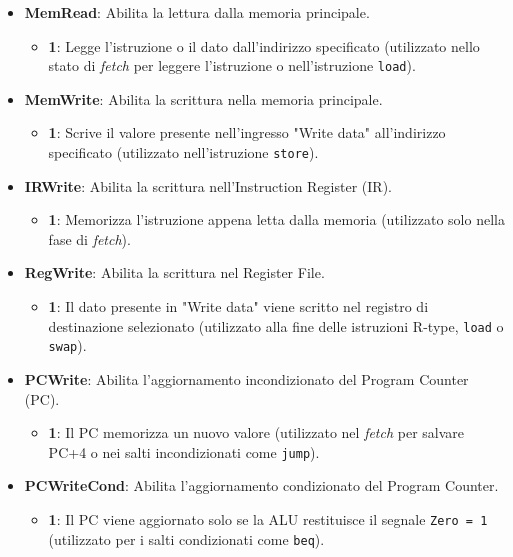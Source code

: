 \begin{itemize}
    \item \textbf{MemRead}: Abilita la lettura dalla memoria principale.
    \begin{itemize}
        \item \textbf{1}: Legge l'istruzione o il dato dall'indirizzo specificato (utilizzato nello stato di \textit{fetch} per leggere l'istruzione o nell'istruzione \texttt{load}).
    \end{itemize}
    \item \textbf{MemWrite}: Abilita la scrittura nella memoria principale.
    \begin{itemize}
        \item \textbf{1}: Scrive il valore presente nell'ingresso "Write data" all'indirizzo specificato (utilizzato nell'istruzione \texttt{store}).
    \end{itemize}
    \item \textbf{IRWrite}: Abilita la scrittura nell'Instruction Register (IR).
    \begin{itemize}
        \item \textbf{1}: Memorizza l'istruzione appena letta dalla memoria (utilizzato solo nella fase di \textit{fetch}).
    \end{itemize}
    \item \textbf{RegWrite}: Abilita la scrittura nel Register File.
    \begin{itemize}
        \item \textbf{1}: Il dato presente in "Write data" viene scritto nel registro di destinazione selezionato (utilizzato alla fine delle istruzioni R-type, \texttt{load} o \texttt{swap}).
    \end{itemize}
    \item \textbf{PCWrite}: Abilita l'aggiornamento incondizionato del Program Counter (PC).
    \begin{itemize}
        \item \textbf{1}: Il PC memorizza un nuovo valore (utilizzato nel \textit{fetch} per salvare PC+4 o nei salti incondizionati come \texttt{jump}).
    \end{itemize}
    \item \textbf{PCWriteCond}: Abilita l'aggiornamento condizionato del Program Counter.
    \begin{itemize}
        \item \textbf{1}: Il PC viene aggiornato solo se la ALU restituisce il segnale \texttt{Zero = 1} (utilizzato per i salti condizionati come \texttt{beq}).
    \end{itemize}
\end{itemize}

